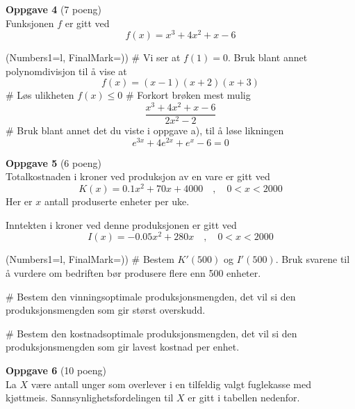 \documentclass[12pt, a4paper]{article}
\begin{document}
\vfill
\clearpage
{\bfseries \large Oppgave 4} (7 poeng) \vspace*{1em} \\
Funksjonen $f$ er gitt ved
$$f(x) = x^3 + 4x^2 + x - 6$$
\begin{easylist}[enumerate]
	\ListProperties(Numbers1=l, FinalMark={)})
	# Vi ser at $f(1) = 0$.
	Bruk blant annet polynomdivisjon til å vise at
	$$f(x) = (x-1)(x+2)(x+3)$$
	# Løs ulikheten $f(x) \leq 0$
	# Forkort brøken mest mulig
	$$
	\frac{x^3 + 4x^2 + x - 6}{2x^2 - 2}
	$$
	# Bruk blant annet det du viste i oppgave a), til å løse likningen
	\begin{equation*}
		e^{3x} + 4e^{2x} + e^x - 6 = 0
	\end{equation*}
\end{easylist}
\vfill
\vspace*{2em}
{\bfseries \large Oppgave 5} (6 poeng) \vspace*{1em} \\
Totalkostnaden i kroner ved produksjon av en vare er gitt ved
\begin{equation*}
	K(x) = 0.1x^2 + 70x + 4000 \quad , \quad 0 < x < 2000
\end{equation*}
Her er $x$ antall produserte enheter per uke.

Inntekten i kroner ved denne produksjonen er gitt ved
\begin{equation*}
	I(x) = -0.05x^2 + 280x \quad , \quad 0 < x < 2000
\end{equation*}
\begin{easylist}[enumerate]
	\ListProperties(Numbers1=l, FinalMark={)})
	# Bestem $K'(500)$ og $I'(500)$.
	Bruk svarene til å vurdere om bedriften bør produsere flere enn 500 enheter.
	
	# Bestem den vinningsoptimale produksjonsmengden, det vil si den produksjonsmengden som gir størst overskudd.
	
	# Bestem den kostnadsoptimale produksjonsmengden, det vil si den produksjonsmengden som gir lavest kostnad per enhet.
\end{easylist}
\vfill
\clearpage
{\bfseries \large Oppgave 6} (10 poeng) \vspace*{1em} \\
La $X$ være antall unger som overlever i en tilfeldig
valgt fuglekasse med kjøttmeis. Sannsynlighetsfordelingen
til $X$ er gitt i tabellen nedenfor.
\end{document}
